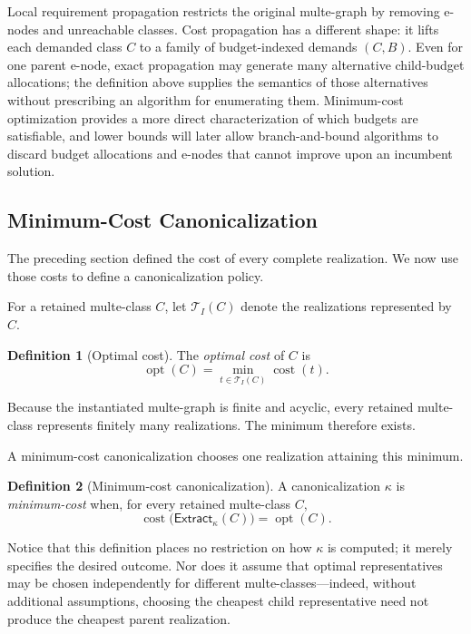 \documentclass[sigconf,nonacm]{acmart}
\theoremstyle{definition}
\newtheorem{definition}{Definition}[section]
\theoremstyle{plain}
\theoremstyle{remark}
\begin{document}
Local requirement propagation restricts the original multe-graph by
removing e-nodes and unreachable classes.  Cost propagation has a
different shape: it lifts each demanded class \(C\) to a family of
budget-indexed demands \((C,B)\).  Even for one parent e-node, exact
propagation may generate many alternative child-budget allocations;
the definition above supplies the semantics of those alternatives
without prescribing an algorithm for enumerating them.
Minimum-cost optimization provides a more direct characterization of
which budgets are satisfiable, and lower bounds will later allow
branch-and-bound algorithms to discard budget allocations and
e-nodes that cannot improve upon an incumbent solution.

\subsection{Minimum-Cost Canonicalization}
\label{sec:scalar-optimization}

The preceding section defined the cost of every complete realization.
We now use those costs to define a canonicalization policy.

For a retained multe-class \(C\), let \(\mathcal T_I(C)\)
denote the realizations represented by \(C\).

\begin{definition}[Optimal cost]
The \emph{optimal cost} of \(C\) is
\[
\operatorname{opt}(C)
=
\min_{t\in\mathcal T_I(C)}
\operatorname{cost}(t).
\]
\end{definition}

Because the instantiated multe-graph is finite and acyclic,
every retained multe-class represents finitely many realizations.
The minimum therefore exists.

A minimum-cost canonicalization chooses one realization attaining this
minimum.

\begin{definition}[Minimum-cost canonicalization]
A canonicalization \(\kappa\)
is \emph{minimum-cost} when, for every retained multe-class \(C\),
\[
\operatorname{cost}
\bigl(
\mathsf{Extract}_\kappa(C)
\bigr)
=
\operatorname{opt}(C).
\]
\end{definition}

Notice that this definition places no restriction on how \(\kappa\) is
computed; it merely specifies the desired outcome.  Nor does it assume
that optimal representatives may be chosen independently for different
multe-classes---indeed, without additional assumptions, choosing the
cheapest child representative need not produce the cheapest parent
realization.
\end{document}
